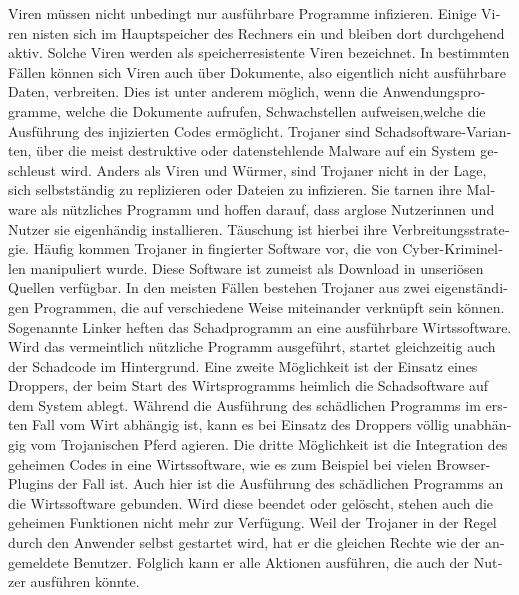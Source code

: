 \begin{otherlanguage}{ngerman}
    Viren müssen nicht unbedingt nur ausführbare Programme infizieren. Einige Viren nisten sich
    im Hauptspeicher des Rechners ein und bleiben dort durchgehend aktiv. Solche Viren werden als \dq speicherresistente\dq{} Viren bezeichnet. 
    \newline In bestimmten Fällen können sich Viren auch über Dokumente, also eigentlich nicht ausführbare Daten, verbreiten. Dies ist unter anderem möglich, wenn die Anwendungsprogramme, welche die Dokumente aufrufen, Schwachstellen aufweisen,welche die Ausführung des injizierten Codes ermöglicht.
    \label{Trojaner}
    \newline Trojaner sind  Schadsoftware-Varianten, über die meist destruktive oder datenstehlende Malware auf ein System geschleust wird. Anders als Viren und Würmer, sind Trojaner nicht in der Lage, sich selbstständig zu replizieren oder Dateien zu infizieren.
    Sie tarnen ihre Malware als nützliches Programm und hoffen darauf, dass arglose Nutzerinnen und Nutzer sie eigenhändig installieren. Täuschung ist hierbei ihre Verbreitungsstrategie. Häufig kommen Trojaner in fingierter Software vor, die von Cyber-Kriminellen manipuliert wurde. Diese Software ist zumeist als Download in unseriösen Quellen verfügbar.
    \newline In den meisten Fällen bestehen Trojaner aus zwei eigenständigen Programmen, die auf verschiedene Weise miteinander verknüpft sein können. Sogenannte Linker heften das Schadprogramm an eine ausführbare Wirtssoftware. Wird das vermeintlich nützliche Programm ausgeführt, startet gleichzeitig auch der Schadcode im Hintergrund.
    \newline Eine zweite Möglichkeit ist der Einsatz eines Droppers, der beim Start des Wirtsprogramms heimlich die Schadsoftware auf dem System ablegt. Während die Ausführung des schädlichen Programms im ersten Fall vom Wirt abhängig ist, kann es bei Einsatz des Droppers völlig unabhängig vom Trojanischen Pferd agieren. 
    \newline Die dritte Möglichkeit ist die Integration des geheimen Codes in eine Wirtssoftware, wie es zum Beispiel bei vielen Browser-Plugins der Fall ist. Auch hier ist die Ausführung des schädlichen Programms an die Wirtssoftware gebunden. Wird diese beendet oder gelöscht, stehen auch die geheimen Funktionen nicht mehr zur Verfügung.
    \newline Weil der Trojaner in der Regel durch den Anwender selbst gestartet wird, hat er die gleichen Rechte wie der angemeldete Benutzer. Folglich kann er alle Aktionen ausführen, die auch der Nutzer ausführen könnte.
    

\end{otherlanguage}
